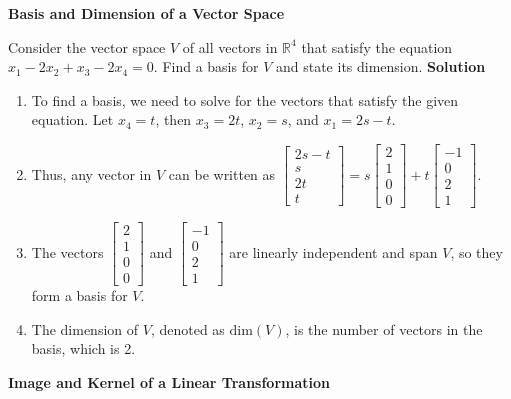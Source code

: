 \documentclass[8pt, a4paper, landscape]{extarticle}
\begin{document}
\begin{multicols*}{4}
  \textbf{Basis and Dimension of a Vector Space}

  Consider the vector space $V$ of all vectors in $\mathbb{R}^4$ that satisfy the equation $x_1 - 2x_2 + x_3 - 2x_4 = 0$. Find a basis for $V$ and state its dimension.
  \textbf{Solution}
  \begin{enumerate}
    \item To find a basis, we need to solve for the vectors that satisfy the given equation. Let $x_4 = t$, then $x_3 = 2t$, $x_2 = s$, and $x_1 = 2s - t$.
    \item Thus, any vector in $V$ can be written as $\begin{bmatrix} 2s - t \\ s \\ 2t \\ t \end{bmatrix} = s\begin{bmatrix} 2 \\ 1 \\ 0 \\ 0 \end{bmatrix} + t\begin{bmatrix} -1 \\ 0 \\ 2 \\ 1 \end{bmatrix}$.
    \item The vectors $\begin{bmatrix} 2 \\ 1 \\ 0 \\ 0 \end{bmatrix}$ and $\begin{bmatrix} -1 \\ 0 \\ 2 \\ 1 \end{bmatrix}$ are linearly independent and span $V$, so they form a basis for $V$.
    \item The dimension of $V$, denoted as $\text{dim}(V)$, is the number of vectors in the basis, which is 2.
  \end{enumerate}

  \textbf{Image and Kernel of a Linear Transformation}


\end{multicols*}
\end{document}
